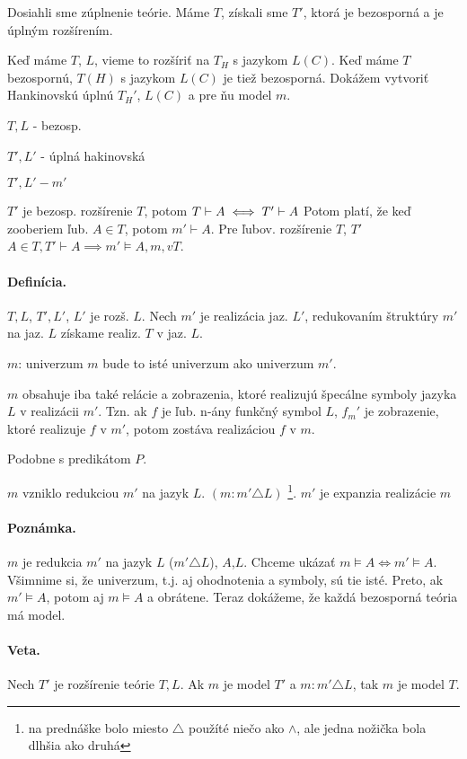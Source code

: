 Dosiahli sme zúplnenie teórie. Máme $T$, získali sme $T'$, ktorá je bezosporná a je úplným rozšírením.

Keď máme $T$, $L$, vieme to rozšíriť na $T_H$ s jazykom $L(C)$. Keď máme $T$ bezospornú, $T(H)$ s jazykom $L(C)$ je tiež bezosporná. Dokážem vytvoriť Hankinovskú úplnú $T_H'$, $L(C)$ a pre ňu model $m$.

$T, L$ - bezosp.

$T', L'$ - úplná hakinovská

$T', L' - m'$

$T'$ je bezosp. rozšírenie $T$, potom $T \vdash A \iff T' \vdash A$ Potom platí, že keď zooberiem ľub. $A \in T$, potom  $m' \vdash A$. Pre ľubov. rozšírenie $T$, $T'$ $A\in T, T' \vdash A \implies m' \models A, m, v T$.

\paragraph{Definícia.}

$T,L$, $T',L'$, $L'$ je rozš. $L$. Nech $m'$ je realizácia jaz. $L'$, redukovaním štruktúry $m'$ na jaz. $L$ získame realiz. $T$ v jaz. $L$.

$m$: univerzum $m$ bude to isté univerzum ako univerzum $m'$.

$m$ obsahuje iba také relácie a zobrazenia, ktoré realizujú špecálne symboly jazyka $L$ v realizácii $m'$. Tzn. ak $f$ je ľub. n-ány funkčný symbol $L$, $f_m'$ je zobrazenie, ktoré realizuje $f$ v $m'$, potom zostáva realizáciou $f$ v $m$.

Podobne s predikátom $P$.

$m$ vzniklo redukciou $m'$ na jazyk $L$. $(m: m' \triangle L)$
\footnote{na prednáške bolo miesto $\triangle$ použíté niečo ako $\land$, ale jedna nožička bola dlhšia ako druhá}.
$m'$ je expanzia realizácie $m$

\paragraph{Poznámka.}
$m$ je redukcia $m'$ na jazyk $L$ ($m'\triangle L$), $A$,$L$. Chceme ukázať $m \models A \iff m' \models A$. Všimnime si, že univerzum, t.j. aj ohodnotenia a symboly, sú tie isté. Preto, ak $m' \models A$, potom aj $m \models A$ a obrátene. Teraz dokážeme, že každá bezosporná teória má model.

\paragraph{Veta.}
Nech $T'$ je rozšírenie teórie $T, L$. Ak $m$ je model $T'$ a $m:m'\triangle L$, tak $m$ je model $T$.


